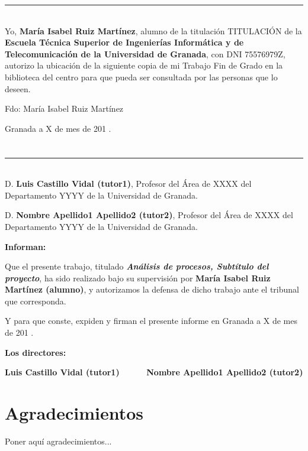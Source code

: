 \noindent\rule[-1ex]{\textwidth}{2pt}\\[4.5ex]

Yo, \textbf{María Isabel Ruiz Martínez}, alumno de la titulación TITULACIÓN de la \textbf{Escuela Técnica Superior
de Ingenierías Informática y de Telecomunicación de la Universidad de Granada}, con DNI 75576979Z, autorizo la
ubicación de la siguiente copia de mi Trabajo Fin de Grado en la biblioteca del centro para que pueda ser
consultada por las personas que lo deseen.

\vspace{6cm}

\noindent Fdo: María Isabel Ruiz Martínez

\vspace{2cm}

\begin{flushright}
Granada a X de mes de 201 .
\end{flushright}


\chapter*{}
\thispagestyle{empty}

\noindent\rule[-1ex]{\textwidth}{2pt}\\[4.5ex]

D. \textbf{Luis Castillo Vidal (tutor1)}, Profesor del Área de XXXX del Departamento YYYY de la Universidad de Granada.

\vspace{0.5cm}

D. \textbf{Nombre Apellido1 Apellido2 (tutor2)}, Profesor del Área de XXXX del Departamento YYYY de la Universidad de Granada.


\vspace{0.5cm}

\textbf{Informan:}

\vspace{0.5cm}

Que el presente trabajo, titulado \textit{\textbf{Análisis de procesos, Subtítulo del proyecto}},
ha sido realizado bajo su supervisión por \textbf{María Isabel Ruiz Martínez (alumno)}, y autorizamos la defensa de dicho trabajo ante el tribunal
que corresponda.

\vspace{0.5cm}

Y para que conste, expiden y firman el presente informe en Granada a X de mes de 201 .

\vspace{1cm}

\textbf{Los directores:}

\vspace{5cm}

\noindent \textbf{Luis Castillo Vidal (tutor1) \ \ \ \ \ Nombre Apellido1 Apellido2 (tutor2)}

\chapter*{Agradecimientos}
\thispagestyle{empty}

       \vspace{1cm}


Poner aquí agradecimientos...

